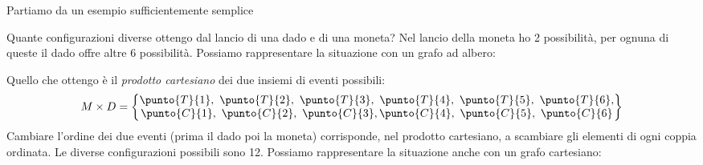 Partiamo da un esempio sufficientemente semplice
\begin{esempio}
Quante configurazioni diverse ottengo dal lancio di una dado e di una moneta?
Nel lancio della moneta ho 2 possibilità, per ognuna di queste il dado 
offre altre 6 possibilità. 
Possiamo rappresentare la situazione con un grafo ad albero:

\medskip
{}

\medskip
Quello che ottengo è il \emph{prodotto cartesiano} dei due insiemi di 
eventi possibili:
\begin{align*}
M \times D = 
\begin{Bmatrix} 
\punto{T}{1},~ \punto{T}{2},~ \punto{T}{3},~
\punto{T}{4},~ \punto{T}{5},~ \punto{T}{6}, \\
\punto{C}{1},~ \punto{C}{2},~ \punto{C}{3}, 
\punto{C}{4},~ \punto{C}{5},~ \punto{C}{6} 
\end{Bmatrix}
\end{align*}
Cambiare l'ordine dei due eventi (prima il dado poi la moneta) corrisponde, 
nel prodotto cartesiano, a scambiare gli elementi di ogni coppia ordinata. 
Le diverse configurazioni possibili sono 12.
Possiamo rappresentare la situazione anche con un grafo cartesiano:
\medskip

\end{esempio}

